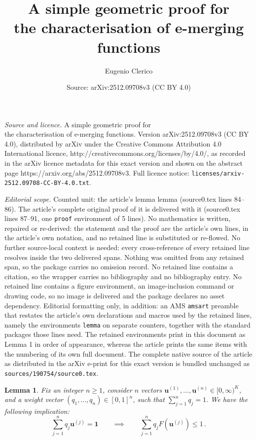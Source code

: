 \documentclass[10pt,a4paper]{amsart}
\title{A simple geometric proof for\\ the characterisation of e-merging functions}
\author{Eugenio Clerico}
\date{Source: arXiv:2512.09708v3 (CC BY 4.0)}
\newtheorem{lemma}{Lemma}
\begin{document}
\maketitle

\noindent\emph{Source and licence.} A simple geometric proof for\\ the characterisation of e-merging functions. Version arXiv:2512.09708v3 (CC BY 4.0), distributed by arXiv under the Creative Commons Attribution 4.0 International licence, http://creativecommons.org/licenses/by/4.0/, as recorded in the arXiv licence metadata for this exact version and shown on the abstract page https://arxiv.org/abs/2512.09708v3. Full licence notice: \texttt{licenses/arxiv-2512.09708-CC-BY-4.0.txt}.\par\smallskip

\noindent\textit{Editorial scope.} Counted unit: the article's lemma lemma (source0.tex lines 84--86). The article's complete original proof of it is delivered with it (source0.tex lines 87--91, one \texttt{proof} environment of 5 lines). No mathematics is written, repaired or re-derived: the statement and the proof are the article's own lines, in the article's own notation, and no retained line is substituted or re-flowed.  No further source-local context is needed: every cross-reference of every retained line resolves inside the two delivered spans.  Nothing was omitted from any retained span, so the package carries no omission record.  No retained line contains a citation, so the wrapper carries no bibliography and no bibliography entry.  No retained line contains a figure environment, an image-inclusion command or drawing code, so no image is delivered and the package declares no asset dependency.  Editorial formatting only, in addition: an AMS \texttt{amsart} preamble that restates the article's own declarations and macros used by the retained lines, namely the environments \texttt{lemma} on separate counters, together with the standard packages those lines need.  The retained environments print in this document as Lemma 1 in order of appearance, whereas the article prints the same items with the numbering of its own full document.  The complete native source of the article as distributed in the arXiv e-print for this exact version is bundled unchanged as \texttt{sources/190754/source0.tex}.
\begin{lemma}\label{lemma}
    Fix an integer $n\geq 1$, consider $n$ vectors $\mathbf{u}^{(1)},\dots, \mathbf{u}^{(n)}\in [0,\infty)^K$, and a weight vector $(q_1,\dots, q_n)\in[0,1]^n$, such that $\sum_{j=1}^n q_j =1$. We have the following implication: $$\sum_{j=1}^n q_j \mathbf{u}^{(j)}= \mathbf{1}\qquad\implies\qquad\sum_{j=1}^n q_j F(\mathbf{u}^{(j)})\leq 1\,.$$
\end{lemma}
\end{document}
